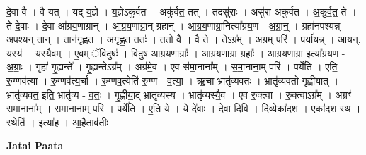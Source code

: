 \documentclass[17pt]{extarticle}
\begin{document}
दे॒वा वै । वै यत् । यद् य॒ज्ञे । य॒ज्ञेऽकु॑र्वत । अकु॑र्वत॒ तत् । तदसु॑राः । असु॑रा अकुर्वत । अ॒कु॒र्व॒त॒ ते । 
ते दे॒वाः । दे॒वा आ᳚ग्रय॒णाग्रान् । आ॒ग्र॒य॒णाग्रा॒न् ग्रहान्॑ । आ॒ग्र॒य॒णाग्रा॒नित्या᳚ग्रय॒ण - अ॒ग्रा॒न्॒ । ग्रहा॑नपश्यन्न् । अ॒प॒श्य॒न् तान् । तान॑गृह्णत । अ॒गृ॒ह्ण॒त॒ ततः॑ । ततो॒ वै । वै ते । तेऽग्र᳚म् । अग्र॒म् परि॑ । पर्या॑यन्न् । आ॒य॒न्॒. यस्य॑ । यस्यै॒वम् । ए॒वम् ॅवि॒दुषः॑ । वि॒दुष॑ आग्रय॒णाग्राः᳚ । आ॒ग्र॒य॒णाग्रा॒ ग्रहाः᳚ । आ॒ग्र॒य॒णाग्रा॒ इत्या᳚ग्रय॒ण - अ॒ग्राः॒ । गृहा॑ गृ॒ह्यन्ते᳚ । गृ॒ह्यन्तेऽग्र᳚म् । अग्र॑मे॒व । ए॒व स॑मा॒नाना᳚म् । स॒मा॒नाना॒म् परि॑ । पर्ये॑ति । ए॒ति॒ रु॒ग्णव॑त्या । रु॒ग्णव॑त्य॒र्चा । रु॒ग्णव॒त्येति॑ रु॒ग्ण - व॒त्या॒ । ऋ॒चा भ्रातृ॑व्यवतः । भ्रातृ॑व्यवतो गृह्णीयात् । भ्रातृ॑व्यवत॒ इति॒ भ्रातृ॑व्य - व॒तः॒ । गृ॒ह्णी॒या॒द् भ्रातृ॑व्यस्य । भ्रातृ॑व्यस्यै॒व । ए॒व रु॒क्त्वा । रु॒क्त्वाऽग्र᳚म् । अग्रꣳ॑ समा॒नाना᳚म् । स॒मा॒नाना॒म् परि॑ । पर्ये॑ति । ए॒ति॒ ये । ये दे॑वाः । दे॒वा॒ दि॒वि । दि॒व्येका॑दश । एका॑दश॒ स्थ । स्थेति॑ । इत्या॑ह । आ॒है॒ताव॑तीः \newline

\textbf{Jatai Paata} \newline
\end{document}

